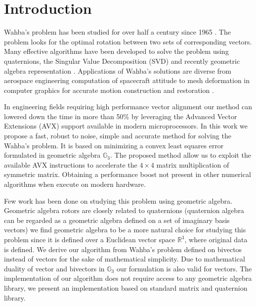 \documentclass{birkjour}
\numberwithin{equation}{section}
\begin{document}
\maketitle
\section{Introduction}

\indent Wahba's problem has been studied for over half a century since 1965 \cite{Wahba1965}. The problem looks for the optimal rotation between two sets of corresponding vectors. Many effective algorithms have been developed to solve the problem \cite{Arun1987, Horn1987, Mortari1996, Shuster1981, Wu2017, Yang2015} using quaternions, the Singular Value Decomposition (SVD) and recently geometric algebra representation \cite{Perwass2009, Dorst2011}. Applications of Wahba's solutions are diverse from aerospace engineering computation of spacecraft attitude \cite{Wu2017} to mesh deformation in computer graphics \cite{Sorkine2007, Sin2013} for accurate motion construction and restoration \cite{Nieto2012, Perwass2009}.

In engineering fields requiring high performance vector alignment our method can lowered down the time in more than 50\% by leveraging the Advanced Vector Extensions (AVX) support available in modern microprocessors. In this work we propose a fast, robust to noise, simple and accurate method for solving the Wahba's problem. It is based on minimizing a convex least squares error formulated in geometric algebra $\mathbb{G}_3$. The proposed method allow us to exploit the available AVX instructions to accelerate the $4\times 4$ matrix multiplication of symmetric matrix. Obtaining a performance boost not present in other numerical algorithms when execute on modern hardware.

Few work has been done on studying this problem using geometric algebra. Geometric algebra rotors are closely related to quaternions (quaternion algebra can be regarded as a geometric algebra defined on a set of imaginary basis vectors) we find geometric algebra to be a more natural choice for studying this problem since it is defined over a Euclidean vector space $\mathbb R^3$, where original data is defined. We derive our algorithm from Wahba's problem defined on bivectos instead of vectors for the sake of mathematical simplicity. Due to mathematical duality of vector and bivectors in $\mathbb{G}_3$ our formulation is also valid for vectors. The implementation of our algorithm does not require access to any geometric algebra library, we present an implementation based on standard matrix and quaternion library. 
\end{document}

